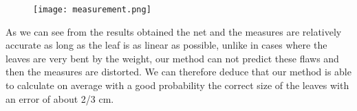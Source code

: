 \begin{figure}
  \centering
  \texttt{[image: measurement.png]}
\end{figure}

As we can see from the results obtained the net and the measures are relatively accurate as long as the leaf is as linear as possible, unlike in cases where
the leaves are very bent by the weight, our method can not predict these flaws and then the measures are distorted. We can therefore deduce that our method is able
to calculate on average with a good probability the correct size of the leaves with an error of about 2/3 cm.







